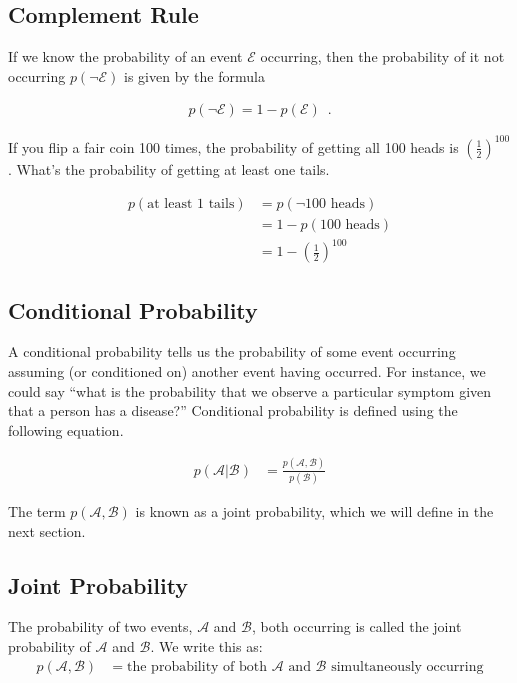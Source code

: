 \documentclass[review_Solutions]{subfiles}
\begin{document}
\subsection{Complement Rule}

\noindent If we know the probability of an event $\mathcal{E}$ occurring, then the probability of it not occurring $p(\neg \mathcal{E})$ is given by the formula

\begin{align}
p(\neg \mathcal{E}) = 1 - p(\mathcal{E}) \enspace .
\end{align}

\begin{exercise}
If you flip a fair coin 100 times, the probability of getting all 100 heads is $\left ( \frac{1}{2} \right)^{100}$.  What's the probability of getting at least one tails.
\begin{boxedsolution}
\begin{align}
p(\mbox{at least 1 tails}) &= p(\neg \mbox{100 heads}) \nonumber \\
&= 1 - p(\mbox{100 heads}) \nonumber \\
&= 1 - \left ( \frac{1}{2} \right)^{100}\nonumber
\end{align}
\end{boxedsolution}

\end{exercise}

\subsection{Conditional Probability}
A conditional probability tells us the probability of some event occurring assuming (or conditioned on) another event having occurred.  For instance, we could say ``what is the probability that we observe a particular symptom given that a person has a disease?''  Conditional probability is defined using the following equation.

\begin{align}
p(\mathcal{A}|\mathcal{B}) &= \frac{p(\mathcal{A}, \mathcal{B})}{p(\mathcal{B})}
\end{align}

The term $p(\mathcal{A}, \mathcal{B})$ is known as a joint probability, which we will define in the next section.

\subsection{Joint Probability}
The probability of two events, $\mathcal{A}$ and $\mathcal{B}$, both occurring is called the joint probability of $\mathcal{A}$ and $\mathcal{B}$.  We write this as:
\begin{align}
p(\mathcal{A}, \mathcal{B}) &= \mbox{the probability of both $\mathcal{A}$ and $\mathcal{B}$ simultaneously occurring}
\end{align}
\end{document}
